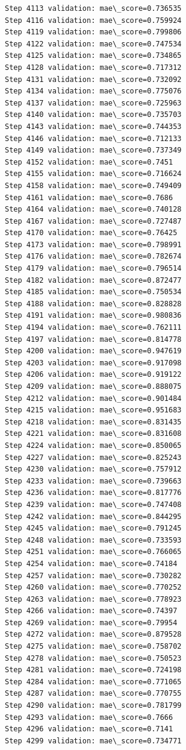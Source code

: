 \documentclass[11pt]{article}
\begin{document}
\begin{Verbatim}[commandchars=\\\{\}]
Step 4113 validation: mae\_score=0.736535
Step 4116 validation: mae\_score=0.759924
Step 4119 validation: mae\_score=0.799806
Step 4122 validation: mae\_score=0.747534
Step 4125 validation: mae\_score=0.734865
Step 4128 validation: mae\_score=0.717312
Step 4131 validation: mae\_score=0.732092
Step 4134 validation: mae\_score=0.775076
Step 4137 validation: mae\_score=0.725963
Step 4140 validation: mae\_score=0.735703
Step 4143 validation: mae\_score=0.744353
Step 4146 validation: mae\_score=0.712133
Step 4149 validation: mae\_score=0.737349
Step 4152 validation: mae\_score=0.7451
Step 4155 validation: mae\_score=0.716624
Step 4158 validation: mae\_score=0.749409
Step 4161 validation: mae\_score=0.7686
Step 4164 validation: mae\_score=0.740128
Step 4167 validation: mae\_score=0.727487
Step 4170 validation: mae\_score=0.76425
Step 4173 validation: mae\_score=0.798991
Step 4176 validation: mae\_score=0.782674
Step 4179 validation: mae\_score=0.796514
Step 4182 validation: mae\_score=0.872477
Step 4185 validation: mae\_score=0.750534
Step 4188 validation: mae\_score=0.828828
Step 4191 validation: mae\_score=0.980836
Step 4194 validation: mae\_score=0.762111
Step 4197 validation: mae\_score=0.814778
Step 4200 validation: mae\_score=0.947619
Step 4203 validation: mae\_score=0.917098
Step 4206 validation: mae\_score=0.919122
Step 4209 validation: mae\_score=0.888075
Step 4212 validation: mae\_score=0.901484
Step 4215 validation: mae\_score=0.951683
Step 4218 validation: mae\_score=0.831435
Step 4221 validation: mae\_score=0.831608
Step 4224 validation: mae\_score=0.850065
Step 4227 validation: mae\_score=0.825243
Step 4230 validation: mae\_score=0.757912
Step 4233 validation: mae\_score=0.739663
Step 4236 validation: mae\_score=0.817776
Step 4239 validation: mae\_score=0.747408
Step 4242 validation: mae\_score=0.844295
Step 4245 validation: mae\_score=0.791245
Step 4248 validation: mae\_score=0.733593
Step 4251 validation: mae\_score=0.766065
Step 4254 validation: mae\_score=0.74184
Step 4257 validation: mae\_score=0.730282
Step 4260 validation: mae\_score=0.770252
Step 4263 validation: mae\_score=0.778923
Step 4266 validation: mae\_score=0.74397
Step 4269 validation: mae\_score=0.79954
Step 4272 validation: mae\_score=0.879528
Step 4275 validation: mae\_score=0.758702
Step 4278 validation: mae\_score=0.750523
Step 4281 validation: mae\_score=0.724198
Step 4284 validation: mae\_score=0.771065
Step 4287 validation: mae\_score=0.770755
Step 4290 validation: mae\_score=0.781799
Step 4293 validation: mae\_score=0.7666
Step 4296 validation: mae\_score=0.7141
Step 4299 validation: mae\_score=0.734771

\end{Verbatim}
\end{document}

